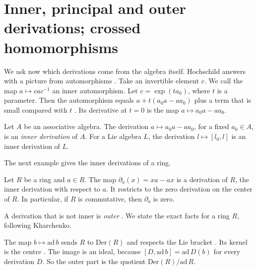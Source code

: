 \section{Inner, principal and outer derivations; crossed homomorphisms}\label{sec:basic-theory:inner-outer}

We ask now which derivations come from the algebra itself. Hochschild answers
with a picture from automorphisms \cite[p.~678]{Hochschild1942}. Take an
invertible element $c$. We call the map $a \mapsto cac^{-1}$ an inner automorphism.
Let $c = \exp(ta_0)$, where $t$ is a parameter. Then the automorphism equals
$a + t(a_0a - aa_0)$ plus a term that is small compared with $t$
\cite[pp.~678--679]{Hochschild1942}. Its derivative at $t=0$ is the map
$a \mapsto a_0a - aa_0$.

\begin{definition}\label{def:basic:inner}
Let $A$ be an associative algebra. The derivation $a \mapsto a_0a - aa_0$,
for a fixed $a_0 \in A$, is an \emph{inner derivation} of $A$. For a Lie
algebra $L$, the derivation $l \mapsto [l_0,l]$ is an inner derivation of $L$.
\end{definition}

The next example gives the inner derivations of a ring.

\begin{example}\label{ex:basic:inner}
Let $R$ be a ring and $a\in R$. The map $\partial_a(x)=xa-ax$ is a derivation of
$R$, the inner derivation with respect to $a$. It restricts to the zero
derivation on the center of $R$. In particular, if $R$ is commutative, then
$\partial_a$ is zero.
\end{example}

A derivation that is not inner is \emph{outer} \cite[pp.~9--10]{Kharchenko1991}. We state the exact facts for a
ring $R$, following Kharchenko.

The map $b \mapsto \mathrm{ad}\,b$ sends $R$ to $\mathrm{Der}(R)$ and respects
the Lie bracket \cite[pp.~9--10]{Kharchenko1991}. Its kernel is the centre
\cite[pp.~9--10]{Kharchenko1991}. The
image is an ideal, because $[D,\mathrm{ad}\,b] = \mathrm{ad}\,D(b)$ for every
derivation $D$. So the outer part is the quotient $\mathrm{Der}(R)/\mathrm{ad}\,R$.

